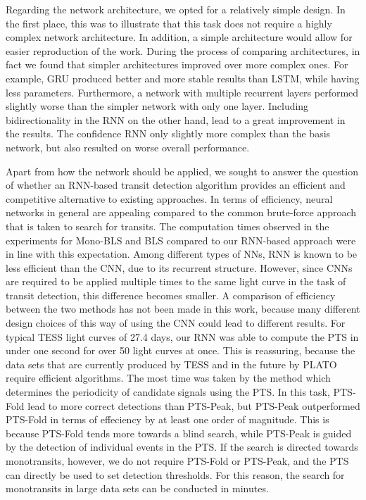 Regarding the network architecture, we opted for a relatively simple design. In the first place, this was to illustrate that this task does not require a highly complex network architecture. In addition, a simple architecture would allow for easier reproduction of the work. During the process of comparing architectures, in fact we found that simpler architectures improved over more complex ones. For example, GRU produced better and more stable results than LSTM, while having less parameters. Furthermore, a network with multiple recurrent layers performed slightly worse than the simpler network with only one layer. Including bidirectionality in the RNN on the other hand, lead to a great improvement in the results. The confidence RNN only slightly more complex than the basis network, but also resulted on worse overall performance.

Apart from how the network should be applied, we sought to answer the question of whether an RNN-based transit detection algorithm provides an efficient and competitive alternative to existing approaches. In terms of efficiency, neural networks in general are appealing compared to the common brute-force approach that is taken to search for transits. The computation times observed in the experiments for Mono-BLS and BLS compared to our RNN-based approach were in line with this expectation. Among different types of NNs, RNN is known to be less efficient than the CNN, due to its recurrent structure. However, since CNNs are required to be applied multiple times to the same light curve in the task of transit detection, this difference becomes smaller. A comparison of efficiency between the two methods has not been made in this work,  because many different design choices of this way of using the CNN could lead to different results. For typical TESS light curves of 27.4 days, our RNN was able to compute the PTS in under one second for over 50 light curves at once. This is reassuring, because the data sets that are currently produced by TESS and in the future by PLATO require efficient algorithms. The most time was taken by the method which determines the periodicity of candidate signals using the PTS. In this task, PTS-Fold lead to more correct detections than PTS-Peak, but PTS-Peak outperformed PTS-Fold in terms of effeciency by at least one order of magnitude. This is because PTS-Fold tends more towards a blind search, while PTS-Peak is guided by the detection of individual events in the PTS. If the search is directed towards monotransits, however, we do not require PTS-Fold or PTS-Peak, and the PTS can directly be used to set detection thresholds. For this reason, the search for monotransits in large data sets can be conducted in minutes.

